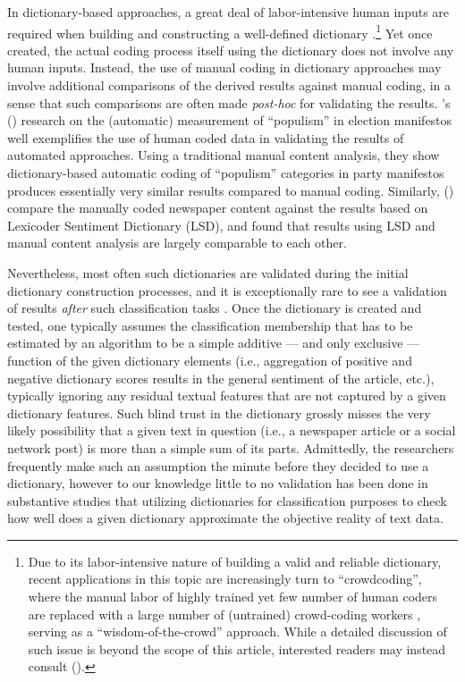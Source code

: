 \documentclass[man, 12pt, a4paper, nolmodern, noextraspace]{apa6}
\begin{document}
    In dictionary-based approaches, a great deal of labor-intensive human inputs are required when building and constructing a well-defined dictionary \parencite{YoungSoroka2012, muddiman2018re}.\footnote{Due to its labor-intensive nature of building a valid and reliable dictionary, recent applications in this topic are increasingly turn to \enquote{crowdcoding}, where the manual labor of highly trained yet few number of human coders are replaced with a large number of (untrained) crowd-coding workers \parencites[e.g.,][]{haselmayer2017sentiment, lind2017content}, serving as a \enquote{wisdom-of-the-crowd} approach. While a detailed discussion of such issue is beyond the scope of this article, interested readers may instead consult \citeauthor{lind2017content} (\citeyear{lind2017content}).} Yet once created, the actual coding process itself using the dictionary does not involve any human inputs. Instead, the use of manual coding in dictionary approaches may involve additional comparisons of the derived results against manual coding, in a sense that such comparisons are often made \textit{post-hoc} for validating the results. \citeauthor{Rooduijn2011}'s (\citeyear{Rooduijn2011}) research on the (automatic) measurement of \enquote{populism} in election manifestos well exemplifies the use of human coded data in validating the results of automated approaches. Using a traditional manual content analysis, they show dictionary-based automatic coding of \enquote{populism} categories in party manifestos produces essentially very similar results compared to manual coding. Similarly, \citeauthor{YoungSoroka2012} (\citeyear{YoungSoroka2012}) compare the manually coded newspaper content against the results based on Lexicoder Sentiment Dictionary (LSD), and found that results using LSD and manual content analysis are largely comparable to each other.
    
    Nevertheless, most often such dictionaries are validated during the initial dictionary construction processes, and it is exceptionally rare to see a validation of results \textit{after} such classification tasks \parencites[yet for notable exceptions, see][]{muddiman2018re, YoungSoroka2012, gonzalez2015signals}. Once the dictionary is created and tested, one typically assumes the classification membership that has to be estimated by an algorithm to be a simple additive --- and only exclusive --- function of the given dictionary elements (i.e., aggregation of positive and negative dictionary scores results in the general sentiment of the article, etc.), typically ignoring any residual textual features that are not captured by a given dictionary features. Such blind trust in the dictionary grossly misses the very likely possibility that a given text in question (i.e., a newspaper article or a social network post) is more than a simple sum of its parts. Admittedly, the researchers frequently make such an assumption the minute before they decided to use a dictionary, however to our knowledge little to no validation has been done in substantive studies that utilizing dictionaries for classification purposes to check how well does a given dictionary approximate the objective reality of text data.
    
\end{document}
